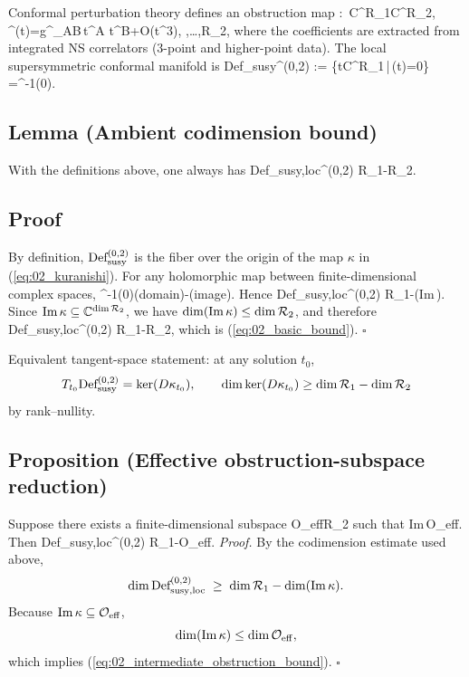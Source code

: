 \documentclass[12pt]{article}
\begin{document}
		Conformal perturbation theory defines an obstruction map
		\ie\label{eq:02_kuranishi}
		\kappa:\ \mathbb C^{\dim\mathcal R_1}\to \mathbb C^{\dim\mathcal R_2},
		\qquad
		\kappa^\alpha(t)=g^\alpha{}_{AB}\,t^A t^B+O(t^3),
		\qquad
		,\ldots,\dim\mathcal R_2,
		\fe
		where the coefficients are extracted from integrated NS correlators (3-point and higher-point data). The local supersymmetric conformal manifold is
		\ie\label{eq:02_defspace}
		\textnormal{Def}_{\rm susy}^{(0,2)}
		\;:=\;
		\{t\in\mathbb C^{\dim\mathcal R_1}\,|\,\kappa(t)=0\}
		\;=\;\kappa^{-1}(0).
		\fe
		
		\subsection*{Lemma (Ambient codimension bound)}
		With the definitions above, one always has
		\ie\label{eq:02_basic_bound}
		\dim \textnormal{Def}_{\rm susy,loc}^{(0,2)}
		\;\ge\;
		\dim\mathcal R_1-\dim\mathcal R_2.
		\fe
		
		\subsection*{Proof}
		By definition, $\textnormal{Def}_{\rm susy}^{(0,2)}$ is the fiber over the origin of the map $\kappa$ in (\ref{eq:02_kuranishi}). For any holomorphic map between finite-dimensional complex spaces,
		\ie
		\dim\kappa^{-1}(0)\;\ge\;\dim(\textnormal{domain})-\dim(\textnormal{image}).
		\fe
		Hence
		\ie
		\dim \textnormal{Def}_{\rm susy,loc}^{(0,2)}
		\;\ge\;
		\dim\mathcal R_1-\dim(\textnormal{Im}\,\kappa).
		\fe
		Since $\textnormal{Im}\,\kappa\subseteq\mathbb C^{\dim\mathcal R_2}$, we have $\dim(\textnormal{Im}\,\kappa)\le \dim\mathcal R_2$, and therefore
		\ie
		\dim \textnormal{Def}_{\rm susy,loc}^{(0,2)}
		\;\ge\;
		\dim\mathcal R_1-\dim\mathcal R_2,
		\fe
		which is (\ref{eq:02_basic_bound}). \hfill$\square$
		
		Equivalent tangent-space statement: at any solution $t_0$,
		\[
		T_{t_0}\textnormal{Def}_{\rm susy}^{(0,2)}=\ker(D\kappa_{t_0}),
		\qquad
		\dim\ker(D\kappa_{t_0})\ge \dim\mathcal R_1-\dim\mathcal R_2
		\]
		by rank--nullity.
		
		\subsection*{Proposition (Effective obstruction-subspace reduction)}
		Suppose there exists a finite-dimensional subspace
		\ie
		\mathcal O_{\rm eff}\subseteq \mathcal R_2
		\fe
		such that
		\ie
		\textnormal{Im}\,\kappa\subseteq \mathcal O_{\rm eff}.
		\fe
		Then
		\ie\label{eq:02_intermediate_obstruction_bound}
		\dim \textnormal{Def}_{\rm susy,loc}^{(0,2)}
		\;\ge\;
		\dim\mathcal R_1-\dim\mathcal O_{\rm eff}.
		\fe
		\textit{Proof.}
		By the codimension estimate used above,
		\[
		\dim \textnormal{Def}_{\rm susy,loc}^{(0,2)}
		\;\ge\;
		\dim\mathcal R_1-\dim(\textnormal{Im}\,\kappa).
		\]
		Because $\textnormal{Im}\,\kappa\subseteq\mathcal O_{\rm eff}$,
		\[
		\dim(\textnormal{Im}\,\kappa)\le \dim\mathcal O_{\rm eff},
		\]
		which implies (\ref{eq:02_intermediate_obstruction_bound}). \hfill$\square$
		
\end{document}
